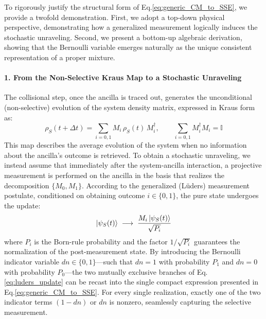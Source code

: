 \documentclass[a4paper,12pt]{article}
\begin{document}
To rigorously justify the structural form of Eq.\ref{eq:generic_CM_to_SSE}, we provide a twofold demonstration. First, we adopt a top-down physical perspective, demonstrating how a generalized measurement logically induces the stochastic unraveling. Second, we present a bottom-up algebraic derivation, showing that the Bernoulli variable emerges naturally as the unique consistent representation of a proper mixture.

\paragraph{1. From the Non-Selective Kraus Map to a Stochastic Unraveling}
The collisional step, once the ancilla is traced out, generates the unconditional (non-selective) evolution of the system density matrix, expressed in Kraus form as:
\begin{equation}
	\rho_{S}(t + \Delta t) = \sum_{i=0,1} M_{i} \, \rho_{S}(t) \, M_{i}^{\dagger}, 
	\qquad \sum_{i=0,1} M_{i}^{\dagger} M_{i} = \mathbb{I}
	\label{eq:kraus_nonselective}
\end{equation}
This map describes the average evolution of the system when no information about the ancilla's outcome is retrieved. To obtain a stochastic unraveling, we instead assume that immediately after the system-ancilla interaction, a projective measurement is performed on the ancilla in the basis that realizes the decomposition $\{M_{0}, M_{1}\}$. According to the generalized (Lüders) measurement postulate, conditioned on obtaining outcome $i \in \{0,1\}$, the pure state undergoes the update:
\begin{equation}
	\ket{\psi_{S}(t)} \;\longrightarrow\; 
	\frac{M_{i} \ket{\psi_{S}(t)}}{\sqrt{P_{i}}}
	\label{eq:luders_update}
\end{equation}
where $P_{i}$ is the Born-rule probability and the factor $1/\sqrt{P_{i}}$ guarantees the normalization of the post-measurement state. By introducing the Bernoulli indicator variable $dn \in \{0,1\}$---such that $dn=1$ with probability $P_{1}$ and $dn=0$ with probability $P_{0}$---the two mutually exclusive branches of Eq.\ref{eq:luders_update} can be recast into the single compact expression presented in Eq.\ref{eq:generic_CM_to_SSE}. For every single realization, exactly one of the two indicator terms $(1-dn)$ or $dn$ is nonzero, seamlessly capturing the selective measurement.
\end{document}
